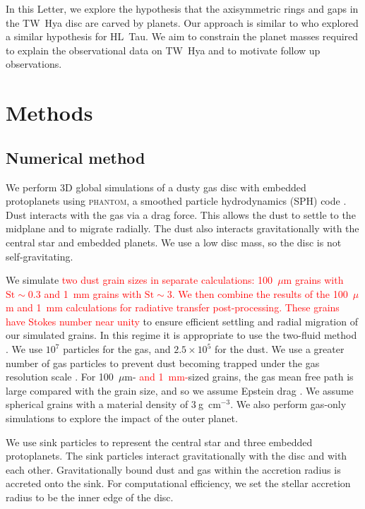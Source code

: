 \documentclass[usenatbib,a4paper,times]{mnras}
\newcommand{\st}{\mathrm{St}}
\renewcommand{\phantom}{\textsc{phantom}}
\newcommand{\new}[1]{{\textcolor{red}{#1}}}
\begin{document}
In this Letter, we explore the hypothesis that the axisymmetric rings and gaps
in the TW~Hya disc are carved by planets. Our approach is similar to
\citet{dipierro:2015} who explored a similar hypothesis for HL~Tau. We aim to
constrain the planet masses required to explain the observational data on TW~Hya
and to motivate follow up observations.










\section{Methods}
\label{sec:methods}

\subsection{Numerical method}

We perform 3D global simulations of a dusty gas disc with embedded protoplanets
using \phantom{}, a smoothed particle hydrodynamics (SPH) code
\citep{price:2018a}. Dust interacts with the gas via a drag force. This allows
the dust to settle to the midplane and to migrate radially. The dust also
interacts gravitationally with the central star and embedded planets. We use a
low disc mass, so the disc is not self-gravitating.

We simulate \new{two dust grain sizes in separate calculations: 100~$\mu$m
grains with $\st{}\sim 0.3$ and 1~mm grains with $\st{}\sim 3$. We then
combine the results of the 100~$\mu$m and 1~mm calculations for radiative
transfer post-processing. These grains have Stokes number near unity} to ensure
efficient settling and radial migration of our simulated grains. In this regime
it is appropriate to use the two-fluid method \citep{laibe:2012a}. We use
$10^7$ particles for the gas, and $2.5\times 10^5$ for the dust. We use a
greater number of gas particles to prevent dust becoming trapped under the gas
resolution scale \citep{laibe:2012a}. For 100~$\mu$m- \new{and 1~mm-}sized
grains, the gas mean free path is large compared with the grain size, and so we
assume Epstein drag \citet{epstein:1924}. We assume spherical grains with a
material density of $3\ $g~cm$^{-3}$. We also perform gas-only simulations to
explore the impact of the outer planet.

We use sink particles \citep{bate:1995} to represent the central star and three
embedded protoplanets. The sink particles interact gravitationally with the disc
and with each other. Gravitationally bound dust and gas within the accretion
radius is accreted onto the sink. For computational efficiency, we set the
stellar accretion radius to be the inner edge of the disc.
\end{document}

